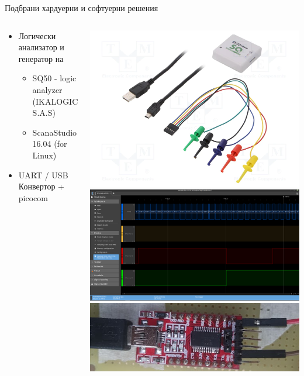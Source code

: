 \documentclass[handout]{beamer}
\begin{document}
\begin{frame}{Подбрани хардуерни и софтуерни решения}
	\begin{columns}
		\begin{block}{ }
			\begin{itemize}
				\pause
				\item Логически анализатор и генератор на 
					\begin{itemize}
						\pause
						\item SQ50 - logic analyzer (IKALOGIC S.A.S)
						\pause
						\item ScanaStudio 16.04 (for Linux)
					\end{itemize}
				\pause
				\item UART / USB Конвертор + picocom
			\end{itemize}
		\end{block}
		\pause
		\includegraphics[width=0.8\linewidth]{Images/SQ50-logic-analyzer.png} \\[0.5em]
		\includegraphics[width=0.8\linewidth]{Images/scana_studio_window.png}\\[0.5em]	
		\includegraphics[width=0.9\linewidth]{Images/uart_usb.png} \\[0.5em]
	\end{columns}
\end{frame}
\end{document}
